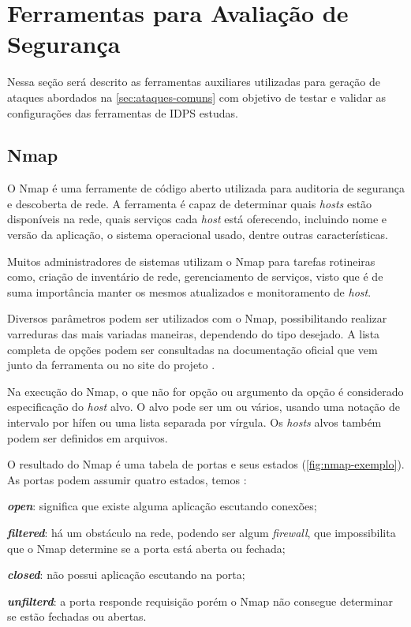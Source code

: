  \section{Ferramentas para Avaliação de Segurança} \label{sec:ferramentas}

 Nessa seção será descrito as ferramentas auxiliares utilizadas para geração de ataques abordados na \autoref{sec:ataques-comuns} com objetivo de testar e validar as configurações das ferramentas de IDPS estudas. 

 \subsection{Nmap} \label{sec:nmap}

 O Nmap é uma ferramente de código aberto utilizada para auditoria de segurança e descoberta de rede. A ferramenta é capaz de determinar quais \textit{hosts} estão disponíveis na rede, quais serviços cada \textit{host} está oferecendo, incluindo nome e versão da aplicação, o sistema operacional usado, dentre outras características.  

 Muitos administradores de sistemas utilizam o Nmap para tarefas rotineiras como, criação de inventário de rede, gerenciamento de serviços, visto que é de suma importância manter os mesmos atualizados e monitoramento de \textit{host}.

 Diversos parâmetros podem ser utilizados com o Nmap, possibilitando realizar varreduras das mais variadas maneiras, dependendo do tipo desejado. A lista completa de opções podem ser consultadas na documentação oficial que vem junto da ferramenta ou no site do projeto \cite{nmap}. 

 Na execução do Nmap, o que não for opção ou argumento da opção é considerado especificação do \textit{host} alvo. O alvo pode ser um ou vários, usando uma notação de intervalo por hífen ou uma lista separada por vírgula. Os \textit{hosts} alvos também podem ser definidos em arquivos.

O resultado do Nmap é uma tabela de portas e seus estados (\autoref{fig:nmap-exemplo}). As portas podem assumir quatro estados, temos \cite{nmap}: 
\begin{alineas}
\item \textbf{\textit{open}}: significa que existe alguma aplicação escutando conexões; 
\item \textbf{\textit{filtered}}: há um obstáculo na rede, podendo ser algum \textit{firewall}, que impossibilita que o Nmap determine se a porta está aberta ou fechada; 
\item \textbf{\textit{closed}}: não possui aplicação escutando na porta; 
\item \textbf{\textit{unfilterd}}: a porta responde requisição porém o Nmap não consegue determinar se estão fechadas ou abertas.
\end{alineas}

